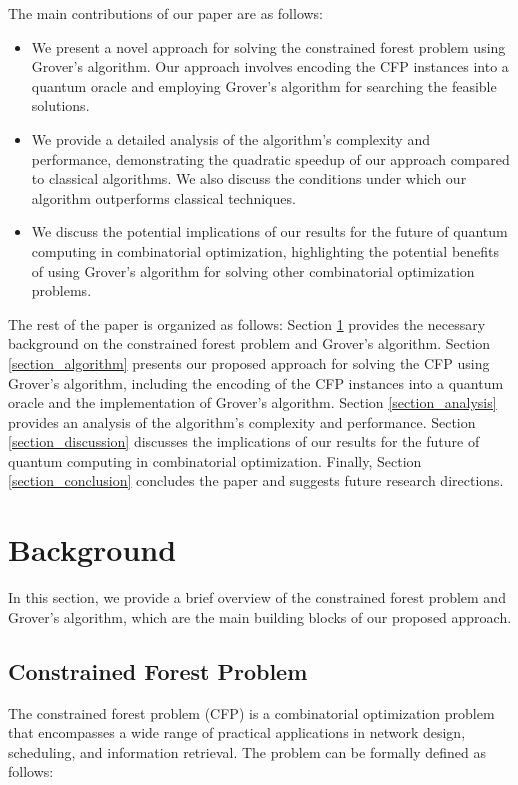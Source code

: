 The main contributions of our paper are as follows:
\begin{itemize}
    \item We present a novel approach for solving the constrained forest problem using Grover's algorithm. Our approach involves encoding the CFP instances into a quantum oracle and employing Grover's algorithm for searching the feasible solutions.
    \item We provide a detailed analysis of the algorithm's complexity and performance, demonstrating the quadratic speedup of our approach compared to classical algorithms. We also discuss the conditions under which our algorithm outperforms classical techniques.
    \item We discuss the potential implications of our results for the future of quantum computing in combinatorial optimization, highlighting the potential benefits of using Grover's algorithm for solving other combinatorial optimization problems.
\end{itemize}

The rest of the paper is organized as follows: Section \ref{section_background} provides the necessary background on the constrained forest problem and Grover's algorithm. Section \ref{section_algorithm} presents our proposed approach for solving the CFP using Grover's algorithm, including the encoding of the CFP instances into a quantum oracle and the implementation of Grover's algorithm. Section \ref{section_analysis} provides an analysis of the algorithm's complexity and performance. Section \ref{section_discussion} discusses the implications of our results for the future of quantum computing in combinatorial optimization. Finally, Section \ref{section_conclusion} concludes the paper and suggests future research directions.

\section{Background} \label{section_background}

In this section, we provide a brief overview of the constrained forest problem and Grover's algorithm, which are the main building blocks of our proposed approach.

\subsection{Constrained Forest Problem}

The constrained forest problem (CFP) is a combinatorial optimization problem that encompasses a wide range of practical applications in network design, scheduling, and information retrieval. The problem can be formally defined as follows:

